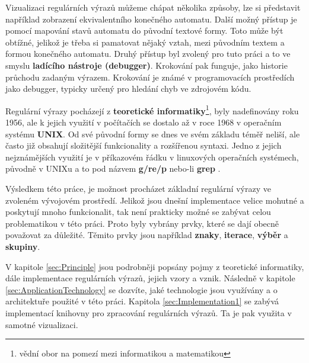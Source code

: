 Vizualizaci regulárních výrazů můžeme chápat několika způsoby, 
lze si představit například zobrazení ekvivalentního konečného automatu.
Další možný přístup je pomocí mapování stavů automatu do původní textové formy. 
Toto může být obtížné, jelikož je třeba si pamatovat nějaký vztah, 
mezi původním textem a formou konečného automatu. 
Druhý přístup byl zvolený pro tuto
práci a to ve smyslu \textbf{ladícího nástroje (debugger)}. Krokování pak funguje, jako historie průchodu zadaným výrazem. 
Krokování je známé v programovacích prostředích jako debugger,
typicky určený pro hledání chyb ve zdrojovém kódu.

Regulární výrazy pocházejí z \textbf{teoretické informatiky}\footnote{vědní obor na pomezí mezi informatikou a matematikou}, 
byly nadefinovány roku 1956, ale k jejich využití v počítačích se dostalo až v roce 1968 v operačním systému \textbf{UNIX}.
Od své původní formy se dnes ve svém základu téměř neliší, ale často již obsahují složitější funkcionality a rozšířenou syntaxi.
Jedno z jejich nejznámějších využití je v příkazovém řádku v linuxových operačních systémech, původně v UNIXu a to pod názvem \textbf{g/re/p} nebo-li \textbf{grep} 
\cite{Wikipedia_2024}. 

Výsledkem této práce, je možnost procházet základní regulární výrazy ve zvoleném vývojovém prostředí. 
Jelikož jsou dnešní implementace velice mohutné a poskytují mnoho funkcionalit, tak není prakticky možné
se zabývat celou problematikou v této práci. 
Proto byly vybrány prvky, které se dají obecně považovat za důležité. 
Těmito prvky jsou například \textbf{znaky}, \textbf{iterace}, \textbf{výběr} a \textbf{skupiny}.

V kapitole \ref{sec:Principle} jsou podrobněji popsány pojmy z teoretické informatiky, dále implementace regulárních výrazů, jejich vzory a vznik.
Následně v kapitole \ref{sec:ApplicationTechnology} se dozvíte, jaké technologie jsou využívány a o architektuře použité v této práci.
Kapitola \ref{sec:Implementation1} se zabývá implementací knihovny pro zpracování regulárních výrazů. 
Ta je pak využita v samotné vizualizaci.

\endinput